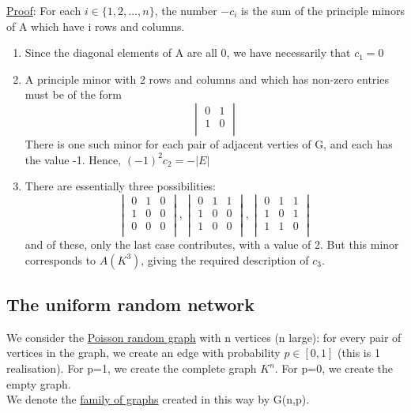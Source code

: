 \documentclass[11pt]{book}
\begin{document}
\underline{Proof}: For each $i \in \{1,2,...,n\}$, the number $-c_{i}$ is the sum of the principle minors of A which have i rows and columns.
\begin{enumerate}
\item Since the diagonal elements of A are all 0, we have necessarily that $c_{1} = 0$
\item A principle minor with 2 rows and columns and which has non-zero entries must be of the form $$\begin{vmatrix}
0 & 1 \\
1 & 0 \\
\end{vmatrix}$$
There is one such minor for each pair of adjacent verties of G, and each has the value -1. Hence, $(-1)^{2}c_{2} = -|E|$
\item There are essentially three possibilities: $$\begin{vmatrix}
0 & 1 & 0 \\
1 & 0 & 0 \\
0 & 0 & 0 \\
\end{vmatrix} , \begin{vmatrix}
0 & 1 & 1 \\
1 & 0 & 0 \\
1 & 0 & 0 \\
\end{vmatrix} , \begin{vmatrix}
0 & 1 & 1 \\
1 & 0 & 1 \\
1 & 1 & 0 \\
\end{vmatrix} $$
and of these, only the last case contributes, with a value of 2. But this minor corresponds to $A(K^{3})$, giving the required description of $c_{3}$.
\end{enumerate}
\subsection{The uniform random network}
We consider the \underline{Poisson random graph} with n vertices (n large): for every pair of vertices in the graph, we create an edge with probability $p \in [0,1]$ (this is 1 realisation). For p=1, we create the complete graph $K^{n}$. For p=0, we create the empty graph.\\

We denote the \underline{family of graphs} created in this way by G(n,p).\\
\end{document}

